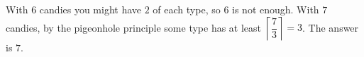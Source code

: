 With $6$ candies you might have $2$ of each type, so $6$ is not enough. With $7$ candies, by the pigeonhole principle some type has at least $\left\lceil\dfrac{7}{3}\right\rceil=3$. The answer is $\boxed{7}$.
